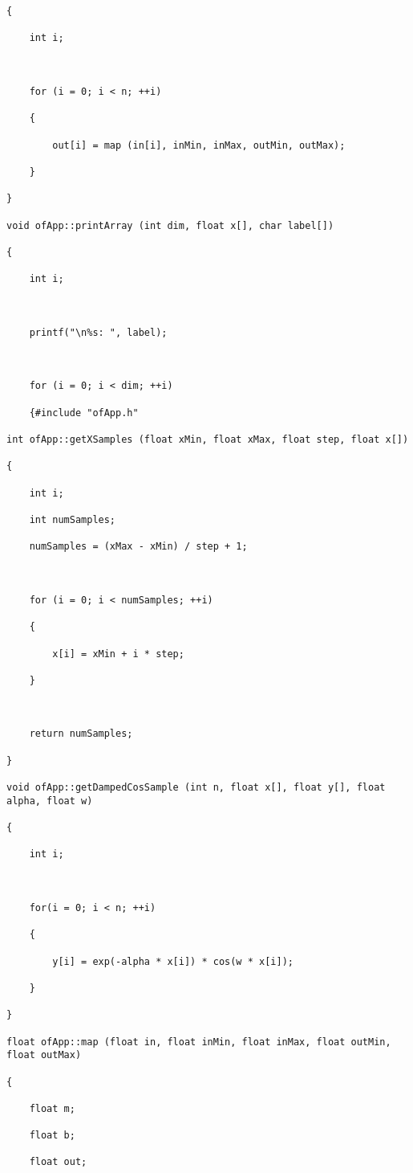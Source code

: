\documentclass[letterpaper, 24pt, final, onecolumn, titlepage] {article}
\begin{document}
\begin{lstlisting}
{

    int i;



    for (i = 0; i < n; ++i)

    {

        out[i] = map (in[i], inMin, inMax, outMin, outMax);

    }

}

void ofApp::printArray (int dim, float x[], char label[])

{

    int i;



    printf("\n%s: ", label);



    for (i = 0; i < dim; ++i)

    {#include "ofApp.h"

int ofApp::getXSamples (float xMin, float xMax, float step, float x[])

{

    int i;

    int numSamples;

    numSamples = (xMax - xMin) / step + 1;



    for (i = 0; i < numSamples; ++i)

    {

        x[i] = xMin + i * step;

    }



    return numSamples;

}

void ofApp::getDampedCosSample (int n, float x[], float y[], float alpha, float w)

{

    int i;



    for(i = 0; i < n; ++i)

    {

        y[i] = exp(-alpha * x[i]) * cos(w * x[i]);

    }

}

float ofApp::map (float in, float inMin, float inMax, float outMin, float outMax)

{

    float m;

    float b;

    float out;




\end{lstlisting}
\end{document}
